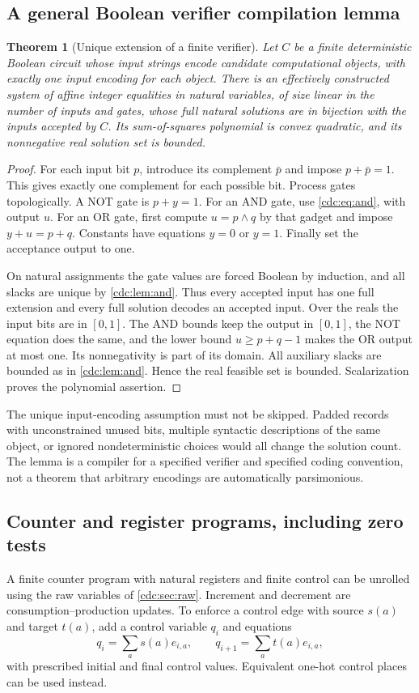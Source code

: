 \documentclass[11pt,a4paper]{article}
\newtheorem{theorem}{Theorem}[section]
\theoremstyle{definition}
\theoremstyle{remark}
\begin{document}
\subsection{A general Boolean verifier compilation lemma}
\begin{theorem}[Unique extension of a finite verifier]\label{cdc:thm:circuit}
Let $C$ be a finite deterministic Boolean circuit whose input strings encode candidate computational objects, with exactly one input encoding for each object. There is an effectively constructed system of affine integer equalities in natural variables, of size linear in the number of inputs and gates, whose full natural solutions are in bijection with the inputs accepted by $C$. Its sum-of-squares polynomial is convex quadratic, and its nonnegative real solution set is bounded.
\end{theorem}
\begin{proof}
For each input bit $p$, introduce its complement $\bar p$ and impose $p+\bar p=1$. This gives exactly one complement for each possible bit. Process gates topologically. A NOT gate is $p+y=1$. For an AND gate, use \eqref{cdc:eq:and}, with output $u$. For an OR gate, first compute $u=p\land q$ by that gadget and impose $y+u=p+q$. Constants have equations $y=0$ or $y=1$. Finally set the acceptance output to one.

On natural assignments the gate values are forced Boolean by induction, and all slacks are unique by \cref{cdc:lem:and}. Thus every accepted input has one full extension and every full solution decodes an accepted input. Over the reals the input bits are in $[0,1]$. The AND bounds keep the output in $[0,1]$, the NOT equation does the same, and the lower bound $u\ge p+q-1$ makes the OR output at most one. Its nonnegativity is part of its domain. All auxiliary slacks are bounded as in \cref{cdc:lem:and}. Hence the real feasible set is bounded. Scalarization proves the polynomial assertion.
\end{proof}

The unique input-encoding assumption must not be skipped. Padded records with unconstrained unused bits, multiple syntactic descriptions of the same object, or ignored nondeterministic choices would all change the solution count. The lemma is a compiler for a specified verifier and specified coding convention, not a theorem that arbitrary encodings are automatically parsimonious.

\subsection{Counter and register programs, including zero tests}
A finite counter program with natural registers and finite control can be unrolled using the raw variables of \cref{cdc:sec:raw}. Increment and decrement are consumption--production updates. To enforce a control edge with source $s(a)$ and target $t(a)$, add a control variable $q_i$ and equations
\[
q_i=\sum_a s(a)e_{i,a},\qquad
q_{i+1}=\sum_a t(a)e_{i,a},
\]
with prescribed initial and final control values. Equivalent one-hot control places can be used instead.
\end{document}

